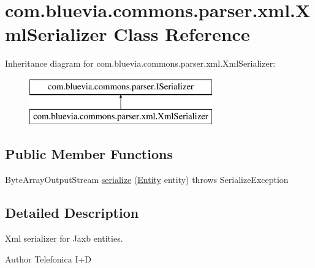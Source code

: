 \hypertarget{classcom_1_1bluevia_1_1commons_1_1parser_1_1xml_1_1XmlSerializer}{
\section{com.bluevia.commons.parser.xml.XmlSerializer Class Reference}
\label{classcom_1_1bluevia_1_1commons_1_1parser_1_1xml_1_1XmlSerializer}
}
Inheritance diagram for com.bluevia.commons.parser.xml.XmlSerializer:\begin{figure}[H]
\begin{center}
\leavevmode
\includegraphics[height=2.000000cm]{classcom_1_1bluevia_1_1commons_1_1parser_1_1xml_1_1XmlSerializer}
\end{center}
\end{figure}
\subsection*{Public Member Functions}
\begin{DoxyCompactItemize}
\item 
ByteArrayOutputStream \hyperlink{classcom_1_1bluevia_1_1commons_1_1parser_1_1xml_1_1XmlSerializer_a2898b6d631c008447f1e06253e61ea66}{serialize} (\hyperlink{interfacecom_1_1bluevia_1_1commons_1_1Entity}{Entity} entity)  throws SerializeException 
\end{DoxyCompactItemize}


\subsection{Detailed Description}
Xml serializer for Jaxb entities.

\begin{DoxyAuthor}{Author}
Telefonica I+D 
\end{DoxyAuthor}


